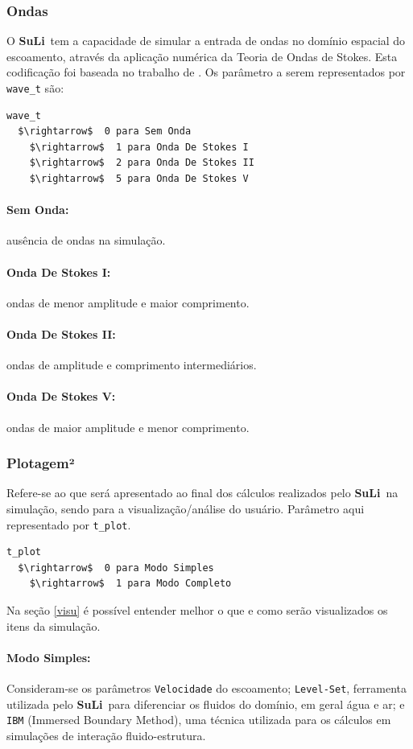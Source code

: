 \documentclass[12pt, a4paper]{article}
\newcommand{\SL}{{\bf SuLi}}
\begin{document}
\subsubsection{Ondas}
O \SL\ tem a capacidade de simular a entrada de ondas no domínio espacial do escoamento, através da aplicação numérica da Teoria de Ondas de Stokes. Esta codificação foi baseada no trabalho de \cite{higuera2013}. Os parâmetro a serem representados por \verb|wave_t| são:
\begin{lstlisting}[escapeinside='']
wave_t	
  $\rightarrow$  0 para Sem Onda
	$\rightarrow$  1 para Onda De Stokes I
	$\rightarrow$  2 para Onda De Stokes II
	$\rightarrow$  5 para Onda De Stokes V
\end{lstlisting}

\paragraph{Sem Onda:} ausência de ondas na simulação.
\paragraph{Onda De Stokes I:} ondas de menor amplitude e maior comprimento.
\paragraph{Onda De Stokes II:} ondas de amplitude e comprimento intermediários.
\paragraph{Onda De Stokes V:} ondas de maior amplitude e menor comprimento.


\subsubsection{Plotagem²}
Refere-se ao que será apresentado ao final dos cálculos realizados pelo \SL\ na simulação, sendo para a visualização/análise do usuário. Parâmetro aqui representado por \verb|t_plot|.
\begin{lstlisting}
t_plot	
  $\rightarrow$  0 para Modo Simples
	$\rightarrow$  1 para Modo Completo
\end{lstlisting}
Na seção \ref{visu} é possível entender melhor o que e como serão visualizados os itens da simulação.

\paragraph{Modo Simples:} Consideram-se os parâmetros \verb|Velocidade| do escoamento; \verb|Level-Set|, ferramenta utilizada pelo \SL\ para diferenciar os fluidos do domínio, em geral água e ar; e \verb|IBM| (Immersed Boundary Method), uma técnica utilizada para os cálculos em simulações de interação fluido-estrutura.
\end{document}
